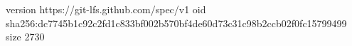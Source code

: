 version https://git-lfs.github.com/spec/v1
oid sha256:dc7745b1c92c2fd1c833bf002b570bf4de60d73c31c98b2ccb02f0fc15799499
size 2730

